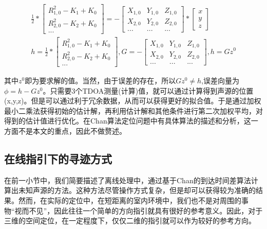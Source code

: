 \documentclass[winfonts,oneside]{njuthesis}
\begin{document}
		\begin{equation}
		\begin{aligned}
			& \frac{1}{2} * {
				\left[ 
					\begin{array}{c}
						R_{1,0}^2 - K_1 + K_0 \\
						R_{2,0}^2 - K_2 + K_0 \\
						...
					\end{array} 
				\right ]}
				= -{
				\left[ 
					\begin{array}{ccc}
						X_{1,0} & Y_{1,0} & Z_{1,0} \\
						X_{2,0} & Y_{2,0} & Z_{2,0} \\
						  ...   &  ...    &   ...
					\end{array}
				\right ]}*{
				\left[ 
					\begin{array}{c}
						x\\
						y\\
						z
					\end{array}
				\right ]} & \\
			& h = \frac{1}{2} * {
				\left[ 
				\begin{array}{c}
				R_{1,0}^2 - K_1 + K_0 \\
				R_{2,0}^2 - K_2 + K_0 \\
				...
				\end{array} 
				\right ]}, 
			G = -{
				\left[ 
				\begin{array}{ccc}
				X_{1,0} & Y_{1,0} & Z_{1,0} \\
				X_{2,0} & Y_{2,0} & Z_{2,0} \\
				...   &  ...    &   ...
				\end{array}
				\right ]},
			h = Gz^0
		\end{aligned}
		\end{equation}

		其中$z^0$即为要求解的值。当然，由于误差的存在，所以$Gz^0\neq h$,误差向量为$\phi = h - Gz^0$。只需要3个TDOA测量(计算)值，就可以通过计算得到声源的位置(x,y,z)。但是可以通过利于冗余数据，从而可以获得更好的拟合值。于是通过加权最小二乘法获得初始的估计解，再利用估计解和其他条件进行第二次加权平均，对得到的估计值进行优化。在Chan算法定位问题\cite{Chan3DTDOA}中有具体算法的描述和分析，这一方面不是本文的重点，因此不做赘述。
		
		\subsection{在线指引下的寻迹方式}
		
		在前一小节中，我们简要描述了离线处理中，通过基于Chan的到达时间差算法计算出未知声源的方法。这种方法尽管操作方式复杂，但是却可以获得较为准确的结果。然而，在实际的定位中，在短距离的室内环境中，我们也不是对周围的事物“视而不见”，因此往往一个简单的方向指引就具有很好的参考意义。因此，对于三维的空间定位，在一定程度下，仅仅二维的指引就可以作为较好的参考方向。
		
\end{document}
